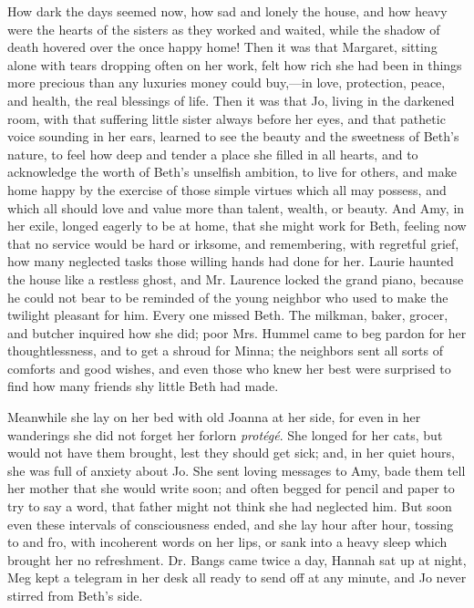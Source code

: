 How dark the days seemed now, how sad and lonely the house, and how
heavy were the hearts of the sisters as they worked and waited, while
the shadow of death hovered over the once happy home! Then it was that
Margaret, sitting alone with tears dropping often on her work, felt how
rich she had been in things more precious than any luxuries money could
buy,---in love, protection, peace, and health, the real blessings of
life. Then it was that Jo, living in the darkened room, with that
suffering little sister always before her eyes, and that pathetic voice
sounding in her ears, learned to see the beauty and the sweetness of
Beth's nature, to feel how deep and tender a place she
filled in all hearts, and to acknowledge the worth of
Beth's unselfish ambition, to live for others, and make
home happy by the exercise of those simple virtues which all may
possess, and which all should love and value more than talent, wealth,
or beauty. And Amy, in her exile, longed eagerly to be at home, that she
might work for Beth, feeling now that no service would be hard or
irksome, and remembering, with regretful grief, how many neglected tasks
those willing hands had done for her. Laurie haunted the house like a
restless ghost, and Mr. Laurence locked the grand piano, because he
could not bear to be reminded of the young neighbor who used to make the
twilight pleasant for him. Every one missed Beth. The milkman, baker,
grocer, and butcher inquired how she did; poor Mrs. Hummel came to beg
pardon for her thoughtlessness, and to get a shroud for Minna; the
neighbors sent all sorts of comforts and good wishes, and even those who
knew her best were surprised to find how many friends shy little Beth
had made.

Meanwhile she lay on her bed with old Joanna at her side, for even in
her wanderings she did not forget her forlorn \emph{protégé}. She longed
for her cats, but would not have them brought, lest they should get
sick; and, in her quiet hours, she was full of anxiety about Jo. She
sent loving messages to Amy, bade them tell her mother that she would
write soon; and often begged for pencil and paper to try to say a word,
that father might not think she had neglected him. But soon even these
intervals of consciousness ended, and she lay hour after hour, tossing
to and fro, with incoherent words on her lips, or sank into a heavy
sleep which brought her no refreshment. Dr. Bangs came twice a day,
Hannah sat up at night, Meg kept a telegram in her desk all ready to
send off at any minute, and Jo never stirred from Beth's
side.

